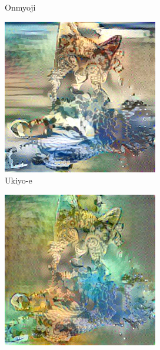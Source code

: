 \documentclass[10pt,twocolumn,letterpaper]{article}
\begin{document}
\begin{figure}
\begin{subfigure}[b]{0.18\textwidth}
    \caption{Onmyoji}
    \label{fig::base12}
  \end{subfigure}
  \begin{subfigure}[b]{0.18\textwidth}
    \includegraphics[width=\textwidth]{figure/baseline2/fsh.jpg}
    \caption{Ukiyo-e}
    \label{fig::base13}
  \end{subfigure}
  \begin{subfigure}[b]{0.18\textwidth}
    \includegraphics[width=\textwidth]{figure/baseline2/fg.jpg}

\end{subfigure}
\end{figure}
\end{document}
